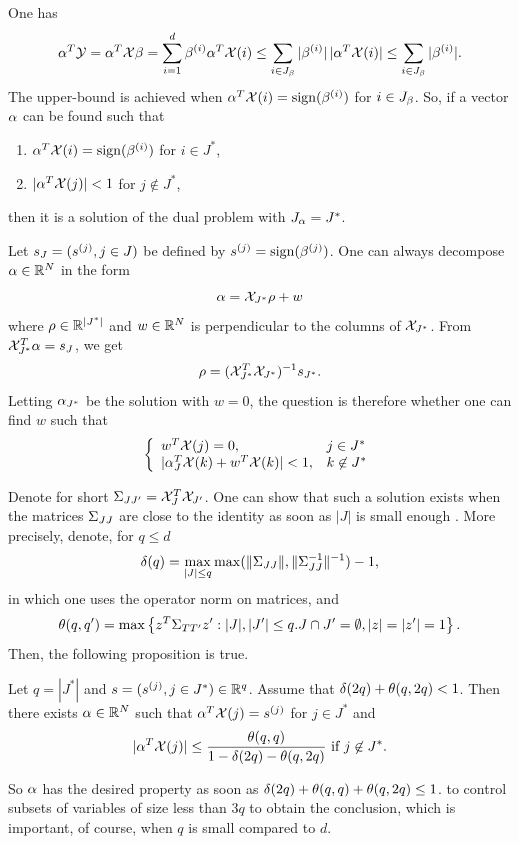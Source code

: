 One has 
\[
\alpha^T{\mathcal Y} = \alpha^T{\mathcal X}\beta = \sum_{i=1}^d \beta^{(i)} \alpha^T{\mathcal X}(i) \leq \sum_{i\in J_\beta} |\beta^{(i)}| \, |\alpha^T{\mathcal X}(i) | \leq \sum_{i\in J_\beta} |\beta^{(i)}|.
\]
The upper-bound is achieved when $\alpha^T{\mathcal X}(i) = \mathrm{sign}(\beta^{(i)})$ for $i\in
J_\beta$. So, if a vector $\alpha$ can be found such that
\begin{enumerate}[label=(\roman*)]
\item $\alpha^T{\mathcal X}(i) = \mathrm{sign}(\beta^{(i)})$ for $i\in
J^*$,
\item $|\alpha^T{\mathcal X}(j)|<1$
for $j\not \in J^*$,
\end{enumerate}
then it is a solution of the dual problem with
$J_\alpha = J^*$. 
\bigskip

Let $s_J =
(s^{(j)}, j\in J)$ be defined by  $s^{(j)} = \mathrm{sign} (\beta^{(j)})$.
One can always decompose $\alpha\in {\mathbb{R}}^N$ in the form
\[
\alpha = {\mathcal X}_{J^*} \rho + w
\]
where $\rho \in {\mathbb{R}}^{|J^*|}$ and $w\in {\mathbb{R}}^N$ is perpendicular to the columns of ${\mathcal X}_{J^*}$. From ${\mathcal X}_{J^*}^T \alpha = s_J$, we get
\[
\rho = ({\mathcal X}_{J^*}^T{\mathcal X}_{J^*})^{-1} s_{J^*}.
\]
Letting $\alpha_{J^*}$ be the solution with $w=0$, the question is
therefore whether one can find $w$ such that
$$
\left\{\begin{array}{ll}
w^T{\mathcal X}(j) = 0, & j\in J^*\\
|\alpha_J^T {\mathcal X}(k) + w^T {\mathcal X}(k)| < 1, & k\not \in J^*
\end{array}
\right.
$$

Denote for short $ \Sigma_{JJ'} = {\mathcal X}_J^T{\mathcal X}_{J'}$. 
One can show that such a solution exists when the matrices
$ \Sigma_{JJ}$ are close to the identity as soon as $|J|$ is small enough \cite{ct05}. More precisely, denote, for $q\leq d$
$$
\delta(q) =\max_{|J| \leq q} \max(\|\Sigma_{JJ}\|, \|\Sigma^{-1}_{JJ}\|^{-1}) - 1,
$$
in which one uses the operator norm on matrices,
and
\[
\theta(q,q') = \max \left\{ z^T \Sigma_{TT'} z':  |J|,|J'|\leq q. J\cap J'=\emptyset, |z| = |z'| = 1 \right\} .
\]
 Then, the
following proposition is true.
\begin{proposition}
Let $q = |J^*|$ and $s = (s^{(j)}, j\in J^*)\in {\mathbb{R}}^q$. Assume that $\delta(2q)
+ \theta(q,2q) <1$. Then there exists $\alpha\in {\mathbb{R}}^N$ such that
$\alpha^T{\mathcal X}(j) = s^{(j)}$ for $j\in J^*$ and
$$
|\alpha^T{\mathcal X}(j)| \leq \frac{\theta(q,q)}{1-\delta(2q) - \theta(q,2q)} \text{ if }
j\not\in J^*.
$$
\end{proposition}
So $\alpha$ has the desired property as soon as $\delta(2q) + \theta(q,q) +
\theta(q,2q) \leq 1$. 
to control subsets of variables of size less than $3q$ to obtain the
conclusion, which is important, of course, when $q$ is small compared to
$d$.
\bigskip


